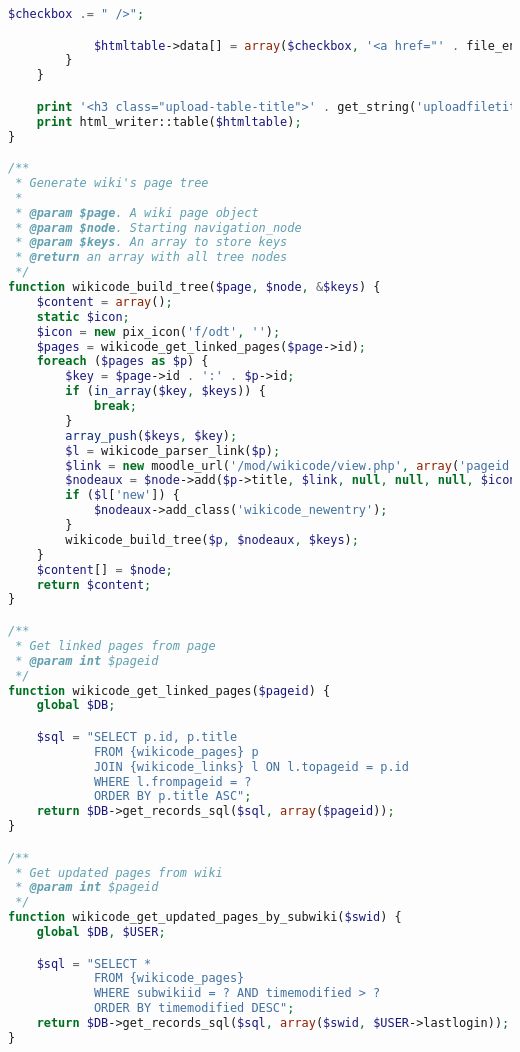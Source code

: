 \begin{lstlisting}[language=PHP]
            $checkbox .= " />";

            $htmltable->data[] = array($checkbox, '<a href="' . file_encode_url($CFG->wwwroot . '/pluginfile.php', '/' . $context->id . '/wikicode_upload/' . $fileitemid . '/' . $file->get_filename()) . '">' . $file->get_filename() . '</a>', "");
        }
    }

    print '<h3 class="upload-table-title">' . get_string('uploadfiletitle', 'wikicode') . "</h3>";
    print html_writer::table($htmltable);
}

/**
 * Generate wiki's page tree
 *
 * @param $page. A wiki page object
 * @param $node. Starting navigation_node
 * @param $keys. An array to store keys
 * @return an array with all tree nodes
 */
function wikicode_build_tree($page, $node, &$keys) {
    $content = array();
    static $icon;
    $icon = new pix_icon('f/odt', '');
    $pages = wikicode_get_linked_pages($page->id);
    foreach ($pages as $p) {
        $key = $page->id . ':' . $p->id;
        if (in_array($key, $keys)) {
            break;
        }
        array_push($keys, $key);
        $l = wikicode_parser_link($p);
        $link = new moodle_url('/mod/wikicode/view.php', array('pageid' => $p->id));
        $nodeaux = $node->add($p->title, $link, null, null, null, $icon);
        if ($l['new']) {
            $nodeaux->add_class('wikicode_newentry');
        }
        wikicode_build_tree($p, $nodeaux, $keys);
    }
    $content[] = $node;
    return $content;
}

/**
 * Get linked pages from page
 * @param int $pageid
 */
function wikicode_get_linked_pages($pageid) {
    global $DB;

    $sql = "SELECT p.id, p.title
            FROM {wikicode_pages} p
            JOIN {wikicode_links} l ON l.topageid = p.id
            WHERE l.frompageid = ?
            ORDER BY p.title ASC";
    return $DB->get_records_sql($sql, array($pageid));
}

/**
 * Get updated pages from wiki
 * @param int $pageid
 */
function wikicode_get_updated_pages_by_subwiki($swid) {
    global $DB, $USER;

    $sql = "SELECT *
            FROM {wikicode_pages}
            WHERE subwikiid = ? AND timemodified > ?
            ORDER BY timemodified DESC";
    return $DB->get_records_sql($sql, array($swid, $USER->lastlogin));
}
\end{lstlisting}

